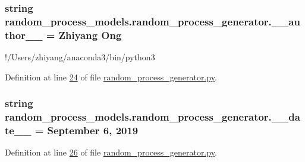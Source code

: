 \subsubsection[{\+\_\+\+\_\+author\+\_\+\+\_\+}]{\setlength{\rightskip}{0pt plus 5cm}string random\+\_\+process\+\_\+models.\+random\+\_\+process\+\_\+generator.\+\_\+\+\_\+author\+\_\+\+\_\+ = \textquotesingle{}Zhiyang Ong\textquotesingle{}}\label{namespacerandom__process__models_1_1random__process__generator_ad5ac8c8c735362abc3272ed79347b666}


!/\+Users/zhiyang/anaconda3/bin/python3 



Definition at line \hyperlink{random__process__generator_8py_source_l00024}{24} of file \hyperlink{random__process__generator_8py_source}{random\+\_\+process\+\_\+generator.\+py}.

\hypertarget{namespacerandom__process__models_1_1random__process__generator_ad850a80bfc86ef183d906895e7f75402}{}
\subsubsection[{\+\_\+\+\_\+date\+\_\+\+\_\+}]{\setlength{\rightskip}{0pt plus 5cm}string random\+\_\+process\+\_\+models.\+random\+\_\+process\+\_\+generator.\+\_\+\+\_\+date\+\_\+\+\_\+ = \textquotesingle{}September 6, 2019\textquotesingle{}}\label{namespacerandom__process__models_1_1random__process__generator_ad850a80bfc86ef183d906895e7f75402}


Definition at line \hyperlink{random__process__generator_8py_source_l00026}{26} of file \hyperlink{random__process__generator_8py_source}{random\+\_\+process\+\_\+generator.\+py}.

\hypertarget{namespacerandom__process__models_1_1random__process__generator_ab646d91986add5570041ec883e29d8da}{}

